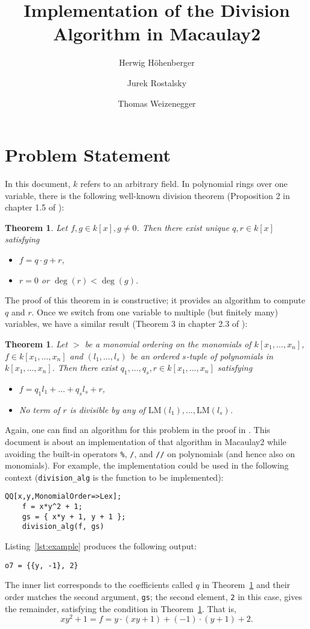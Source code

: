 \documentclass[a4paper]{scrartcl}
\title{Implementation of the Division Algorithm in Macaulay2}
\author{Herwig Höhenberger \and Jurek Rostalsky \and Thomas Weizenegger}
\newtheorem{thm}[defi]{Theorem}
\newcommand{\kx}{k[x_1, \dots, x_n]}
\newcommand{\LM}{\ensuremath{\mathrm{LM}}}
\begin{document}
\maketitle
\section{Problem Statement}
In this document, $k$ refers to an arbitrary field.
In polynomial rings over one variable, there is the following well-known division theorem
(Proposition 2 in chapter 1.5 of \cite{cox-2013}):
\begin{thm}
	Let $f, g \in k[x], g \neq 0$.
	Then there exist unique $q, r \in k[x]$ satisfying
	\begin{itemize}
		\item $f = q \cdot g + r$,
		\item $r=0$ or $\deg(r) < \deg(g)$.
	\end{itemize}
\end{thm}
The proof of this theorem in \cite{cox-2013} is constructive; it provides an algorithm to compute $q$ and $r$.
Once we switch from one variable to multiple (but finitely many) variables, we have a similar result
(Theorem 3 in chapter 2.3 of \cite{cox-2013}):
\begin{thm}\label{thm:multi-var-div}
	Let $>$ be a monomial ordering on the monomials of $\kx$, $f \in \kx$
	and $(l_1, \dots, l_s)$ be an ordered $s$-tuple of polynomials in $\kx$.
	Then there exist $q_1, \dots, q_s, r \in \kx$ satisfying
	\begin{itemize}
		\item $f = q_1l_1 + \dots + q_sl_s + r$,
		\item No term of $r$ is divisible by any of $\LM(l_1), \dots, \LM(l_s)$.
	\end{itemize}
\end{thm}
Again, one can find an algorithm for this problem in the proof in \cite{cox-2013}.
This document is about an implementation of that algorithm in Macaulay2
while avoiding the built-in operators \texttt{\%}, \texttt{/}, and \texttt{//} on polynomials (and hence also on monomials).
For example, the implementation could be used in the following context (\texttt{division\_alg} is the function to be implemented):
\begin{lstlisting}[caption={Example Usage},label=lst:example]
	QQ[x,y,MonomialOrder=>Lex];
	f = x*y^2 + 1;
	gs = { x*y + 1, y + 1 };
	division_alg(f, gs)
\end{lstlisting}
Listing~\ref{lst:example} produces the following output:
\begin{lstlisting}
o7 = {{y, -1}, 2}
\end{lstlisting}
The inner list corresponds to the coefficients called \(q\) in Theorem~\ref{thm:multi-var-div} and their order matches the second argument, \texttt{gs}; the second element, \texttt{2} in this case, gives the remainder, satisfying the condition in Theorem~\ref{thm:multi-var-div}.
That is,
\begin{equation*}
  xy^2 + 1 = f = y \cdot (xy + 1) + (-1) \cdot (y + 1) + 2.
\end{equation*}
\end{document}
